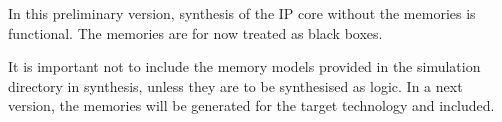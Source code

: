 In this preliminary version, synthesis of the IP core without the memories is
functional. The memories are for now treated as black boxes.

It is important not to include the memory models provided in the simulation
directory in synthesis, unless they are to be synthesised as logic. In a
next version, the memories will be generated for the target technology and
included.

